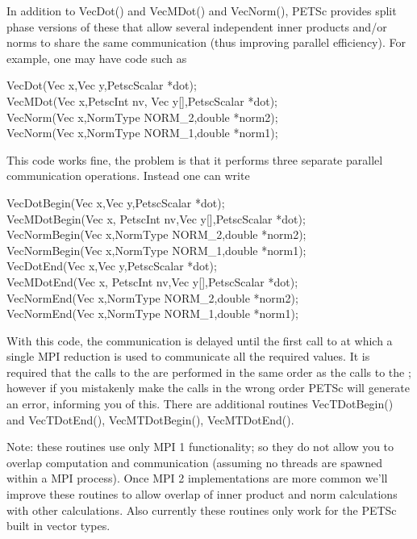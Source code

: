 In addition to VecDot() and VecMDot() and VecNorm(), PETSc provides
split phase versions of these that allow several independent inner products and/or norms
to share the same communication (thus improving parallel efficiency). For example,
one may have code such as 
\begin{tabbing}
 VecDot(Vec x,Vec y,PetscScalar *dot);\\
 VecMDot(Vec x,PetscInt nv, Vec y[],PetscScalar *dot);\\
 VecNorm(Vec x,NormType NORM\_2,double *norm2);\\
 VecNorm(Vec x,NormType NORM\_1,double *norm1);
\end{tabbing}
This code works fine, the problem is that it performs three separate parallel communication
operations. Instead one can write 
\begin{tabbing}
 VecDotBegin(Vec x,Vec y,PetscScalar *dot);\\
 VecMDotBegin(Vec x, PetscInt nv,Vec y[],PetscScalar *dot);\\
 VecNormBegin(Vec x,NormType NORM\_2,double *norm2);\\
 VecNormBegin(Vec x,NormType NORM\_1,double *norm1);\\
 VecDotEnd(Vec x,Vec y,PetscScalar *dot);\\
 VecMDotEnd(Vec x, PetscInt nv,Vec y[],PetscScalar *dot);\\
 VecNormEnd(Vec x,NormType NORM\_2,double *norm2);\\
 VecNormEnd(Vec x,NormType NORM\_1,double *norm1);
\end{tabbing}
With this code,    
    
the  communication is delayed until the first call to 
 at which 
a single MPI reduction is used to communicate all the required values. It is required that the
calls to the  are performed in the same order as the calls to the 
; however if you mistakenly make the calls in the wrong order PETSc
will generate an error,
informing you of this. There are additional routines VecTDotBegin() and 
VecTDotEnd(), VecMTDotBegin(), VecMTDotEnd().  
 

Note: these routines use only MPI 1 functionality; so they do not allow you to overlap 
computation and communication (assuming no threads are spawned within a MPI process). 
Once MPI 2 implementations are more common we'll improve these
routines to allow overlap of inner product and norm calculations with other calculations.
Also currently these routines only work for the PETSc built in vector types.

